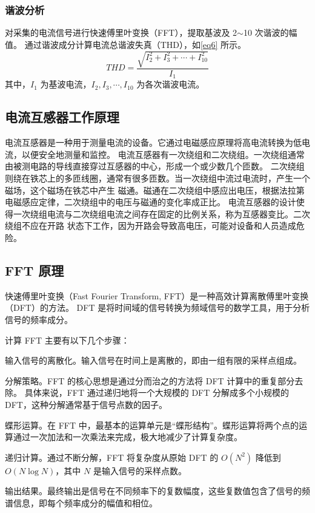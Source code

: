 \documentclass[a4paper,12pt,UTF8]{article}
\begin{document}
\subsubsection{谐波分析}
对采集的电流信号进行快速傅里叶变换（FFT），提取基波及 2$\sim$10 次谐波的幅值。
通过谐波成分计算电流总谐波失真（THD），如\autoref{eq6} 所示。
\begin{equation}
    THD = \frac{\sqrt{I_2^2 + I_3^2 + \cdots + I_{10}^2}}{I_1}
    \label{eq6}
\end{equation}
其中，$I_1$ 为基波电流，$I_2, I_3, \cdots, I_{10}$ 为各次谐波电流。

\subsection{电流互感器工作原理}
电流互感器是一种用于测量电流的设备。它通过电磁感应原理将高电流转换为低电流，以便安全地测量和监控。
电流互感器有一次绕组和二次绕组。一次绕组通常由被测电路的导线直接穿过互感器的中心，形成一个或少数几个匝数。
二次绕组则绕在铁芯上的多匝线圈，通常有很多匝数。当一次绕组中流过电流时，产生一个磁场，这个磁场在铁芯中产生
磁通。磁通在二次绕组中感应出电压，根据法拉第电磁感应定律，二次绕组中的电压与磁通的变化率成正比。
电流互感器的设计使得一次绕组电流与二次绕组电流之间存在固定的比例关系，称为互感器变比。二次绕组不应在开路
状态下工作，因为开路会导致高电压，可能对设备和人员造成危险。

\subsection{FFT 原理}
快速傅里叶变换（Fast Fourier Transform, FFT）是一种高效计算离散傅里叶变换（DFT）的方法。
DFT 是将时间域的信号转换为频域信号的数学工具，用于分析信号的频率成分。

计算 FFT 主要有以下几个步骤：

输入信号的离散化。输入信号在时间上是离散的，即由一组有限的采样点组成。

分解策略。FFT 的核心思想是通过分而治之的方法将 DFT 计算中的重复部分去除。
具体来说，FFT 通过递归地将一个大规模的 DFT 分解成多个小规模的 DFT，这种分解通常基于信号点数的因子。

蝶形运算。在 FFT 中，最基本的运算单元是“蝶形结构”。蝶形运算将两个点的运算通过一次加法和一次乘法来完成，极大地减少了计算复杂度。

递归计算。通过不断分解，FFT 将复杂度从原始 DFT 的 $O(N^2)$ 降低到 $O(N \log N)$，其中 $N$ 是输入信号的采样点数。

输出结果。最终输出是信号在不同频率下的复数幅度，这些复数值包含了信号的频谱信息，即每个频率成分的幅值和相位。
\end{document}
